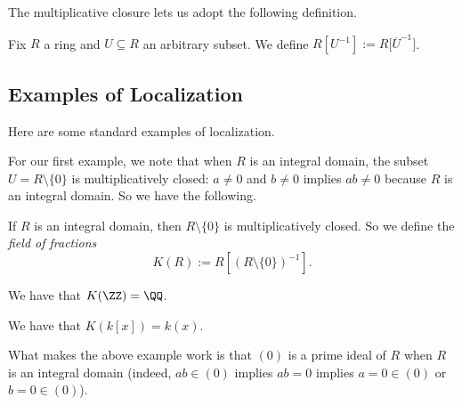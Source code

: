 The multiplicative closure lets us adopt the following definition.
\begin{definition}
	Fix $R$ a ring and $U\subseteq R$ an arbitrary subset. We define $R\left[U^{-1}\right]:=R\big[\overline U^{-1}\big]$.
\end{definition}

\subsection{Examples of Localization}
Here are some standard examples of localization.

For our first example, we note that when $R$ is an integral domain, the subset $U=R\setminus\{0\}$ is multiplicatively closed: $a\ne0$ and $b\ne0$ implies $ab\ne0$ because $R$ is an integral domain. So we have the following.
\begin{definition}
	If $R$ is an integral domain, then $R\setminus\{0\}$ is multiplicatively closed. So we define the \textit{field of fractions}
	\[K(R):=R\left[(R\setminus\{0\})^{-1}\right].\]
\end{definition}
\begin{example}
	We have that $K(\ZZ)=\QQ$.
\end{example}
\begin{example}
	We have that $K(k[x])=k(x)$.
\end{example}
What makes the above example work is that $(0)$ is a prime ideal of $R$ when $R$ is an integral domain (indeed, $ab\in(0)$ implies $ab=0$ implies $a=0\in(0)$ or $b=0\in(0)$).

